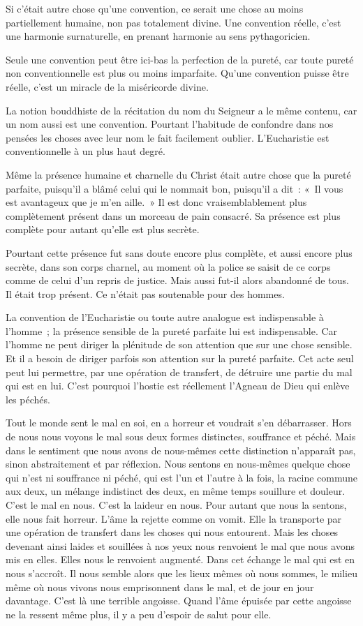 \documentclass[french,twoside]{book} %
\begin{document}
Si c'était autre chose qu'une convention, ce serait une chose au moins partiellement humaine, non pas totalement divine. Une convention réelle, c'est une harmonie surnaturelle, en prenant harmonie au sens pythagoricien.\par
Seule une convention peut être ici-bas la perfection de la pureté, car toute pureté non conventionnelle est plus ou moins imparfaite. Qu'une convention puisse être réelle, c'est un miracle de la miséricorde divine.\par
La notion bouddhiste de la récitation du nom du Seigneur a le même contenu, car un nom aussi est une convention. Pourtant l'habitude de confondre dans nos pensées les choses avec leur nom le fait facilement oublier. L'Eucharistie est conventionnelle à un plus haut degré.\par
Même la présence humaine et charnelle du Christ était autre chose que la pureté parfaite, puisqu'il a blâmé celui qui le nommait bon, puisqu'il a dit : « Il vous est avantageux que je m'en aille. » Il est donc vraisemblablement plus complètement présent dans un morceau de pain consacré. Sa présence est plus complète pour autant qu'elle est plus secrète.\par
Pourtant cette présence fut sans doute encore plus complète, et aussi encore plus secrète, dans son corps charnel, au moment où la police se saisit de ce corps comme de celui d'un repris de justice. Mais aussi fut-il alors abandonné de tous. Il était trop présent. Ce n'était pas soutenable pour des hommes.\par
La convention de l'Eucharistie ou toute autre analogue est indispensable à l'homme ; la présence sensible de la pureté parfaite lui est indispensable. Car l'homme ne peut diriger la plénitude de son attention que sur une chose sensible. Et il a besoin de diriger parfois son attention sur la pureté parfaite. Cet acte seul peut lui permettre, par une opération de transfert, de détruire une partie du mal qui est en lui. C'est pourquoi l'hostie est réellement l'Agneau de Dieu qui enlève les péchés.\par
Tout le monde sent le mal en soi, en a horreur et voudrait s'en débarrasser. Hors de nous nous voyons le mal sous deux formes distinctes, souffrance et péché. Mais dans le sentiment que nous avons de nous-mêmes cette distinction n'apparaît pas, sinon abstraitement et par réflexion. Nous sentons en nous-mêmes quelque chose qui n'est ni souffrance ni péché, qui est l'un et l'autre à la fois, la racine commune aux deux, un mélange indistinct des deux, en même temps souillure et douleur. C'est le mal en nous. C'est la laideur en nous. Pour autant que nous la sentons, elle nous fait horreur. L'âme la rejette comme on vomit. Elle la transporte par une opération de transfert dans les choses qui nous entourent. Mais les choses devenant ainsi laides et souillées à nos yeux nous renvoient le mal que nous avons mis en elles. Elles nous le renvoient augmenté. Dans cet échange le mal qui est en nous s'accroît. Il nous semble alors que les lieux mêmes où nous sommes, le milieu même où nous vivons nous emprisonnent dans le mal, et de jour en jour davantage. C'est là une terrible angoisse. Quand l'âme épuisée par cette angoisse ne la ressent même plus, il y a peu d'espoir de salut pour elle.\par
\end{document}
